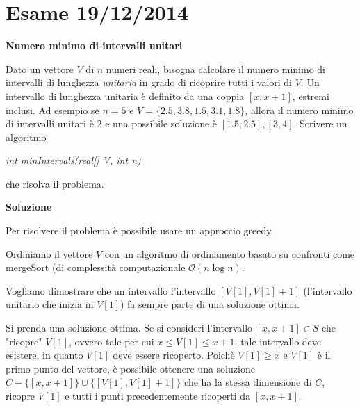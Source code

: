 \documentclass[../cheatSheetAlgoritmi.tex]{subfiles}
\begin{document}
\section{Esame 19/12/2014}
\textbf{Numero minimo di intervalli unitari} 

Dato un vettore $V$ di $n$ numeri reali, bisogna calcolare il numero minimo di intervalli di lunghezza \emph{unitaria} in grado di ricoprire tutti i valori di $V$.  Un intervallo di lunghezza unitaria è definito da una coppia $[x, x + 1]$, estremi inclusi. Ad esempio se $n= 5$ e $V=\{2.5,3.8,1.5,3.1,1.8\}$, allora il numero minimo di intervalli unitari è $2$ e una possibile soluzione è $[1.5,2.5] ,[3,4]$. Scrivere un algoritmo 
\begin{center}
	\emph{int minIntervals(real[] V, int n)}
\end{center}
che risolva il problema. 

\textbf{Soluzione} 

Per risolvere il problema è possibile usare un approccio greedy. 

Ordiniamo il vettore $V$ con un algoritmo di ordinamento basato su confronti come mergeSort (di complessità computazionale $\mathcal{O}(n \log n)$. 

Vogliamo dimostrare che un intervallo l'intervallo $[V[1], V[1] + 1]$ (l'intervallo unitario che inizia in $V[1]$) fa sempre parte di una soluzione ottima.  

Si prenda una soluzione ottima. Se si consideri l'intervallo $[x, x + 1] \in S$ che "ricopre" $V[1]$, ovvero tale per cui $x \leq V[1] \leq x + 1$; tale intervallo deve esistere, in quanto $V[1]$ deve essere ricoperto. Poichè $V[1] \geq x$ e $V[1]$ è il primo punto del vettore, è possibile ottenere una soluzione $C - \{[x, x + 1]\} \cup \{[V[1], V[1] + 1]\}$ che ha la stessa dimensione di $C$, ricopre $V[1]$ e tutti i punti precedentemente ricoperti da $[x, x + 1]$. 
\end{document}
